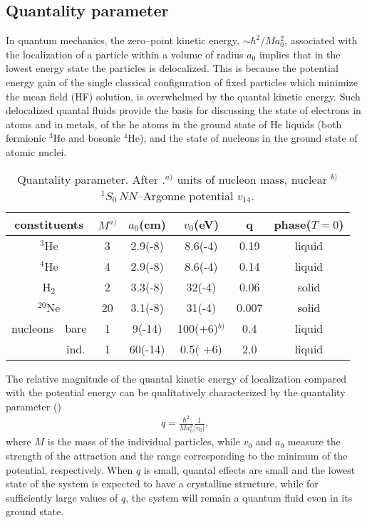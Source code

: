 \documentclass[a4paper,11pt]{book}
\begin{document}
\subsection*{Quantality parameter}
In quantum mechanics, the zero--point kinetic energy, $\sim\hbar^2/Ma_0^2$, associated with  the localization of a particle within a volume of radius $a_0$ implies that in the lowest energy state the particles is delocalized. This is because the potential energy gain of the single classical configuration of fixed particles which minimize the mean field (HF) solution, is overwhelmed by the quantal kinetic energy. Such delocalized quantal fluids provide the basis for discussing the state of electrons in atoms and in metals, of the he atoms in the ground state of He liquids (both fermionic $^3$He and bosonic $^4$He), and the state of nucleons in the ground state of atomic nuclei.

\begin{table}[h]
 \begin{tabular}{|c|c|c|c|c|c|c|}
 \hline  \multicolumn{2}{|c|}{constituents} & $M^{a)}$  & $a_0$(cm) &$v_0$(eV)  &q&phase($T=0$)    \\ 
 \hline  \multicolumn{2}{|c|}{ $^{3}$He}  &3& 2.9(-8)  &8.6(-4)  &0.19  &liquid    \\ 
 \hline  \multicolumn{2}{|c|}{$^{4}$He}  &4&  2.9(-8)&  8.6(-4)&  0.14& liquid   \\ 
 \hline  \multicolumn{2}{|c|}{  H$_2$}&2&  3.3(-8)&  32(-4)&  0.06&solid   \\ 
 \hline    \multicolumn{2}{|c|}{$^{20}$Ne}&20& 3.1(-8) &  31(-4)&  0.007&solid    \\ 
 \hline    nucleons&bare&1&  9(-14)& 100(+6)$^{b)}$ &  0.4&liquid  \\ 
 \cline{2-7} &ind.&1&60(-14)&0.5(
 +6)&2.0&liquid\\
 \hline
 \end{tabular}
 \caption{Quantality parameter. After \cite{Mottelson:02}.$^{a)}$ units of nucleon mass,  nuclear $^{b)}$ $^1S_0\, NN$--Argonne potential $v_{14}$.}\label{tab2C2}
 \end{table}
The relative magnitude of the quantal kinetic energy of localization compared with the potential energy can be qualitatively characterized by the quantality parameter (\cite{Mottelson:02})
\begin{align}
q=\frac{\hbar^2}{Ma_0^2}\frac{1}{|v_0|},
\end{align} 
where $M$ is the mass of the individual particles, while $v_0$ and $a_0$ measure  the strength of the attraction and the range corresponding to the minimum of the potential, respectively. When $q$ is small, quantal effects are small and the lowest state of the system is expected to have a crystalline structure, while for sufficiently large values of $q$, the system will remain a quantum fluid even in its ground state.
\end{document}
